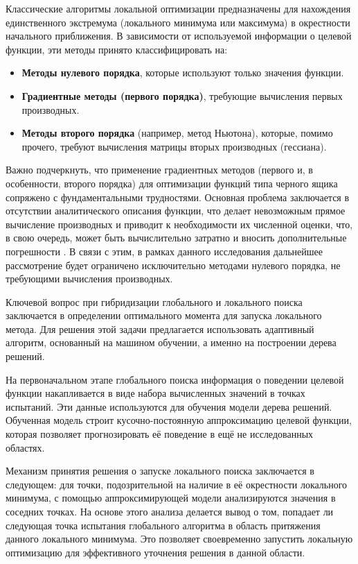 \documentclass[runningheads]{llncs}
\begin{document}


Классические алгоритмы локальной оптимизации предназначены для нахождения единственного экстремума (локального минимума или максимума) в окрестности начального приближения. В зависимости от используемой информации о целевой функции, эти методы принято классифицировать на:
\begin{itemize}
	\item \textbf{Методы нулевого порядка}, которые используют только значения функции.
	\item \textbf{Градиентные методы (первого порядка)}, требующие вычисления первых производных.
	\item \textbf{Методы второго порядка} (например, метод Ньютона), которые, помимо прочего, требуют вычисления матрицы вторых производных (гессиана).
\end{itemize}

Важно подчеркнуть, что применение градиентных методов (первого и, в особенности, второго порядка) для оптимизации функций типа черного ящика сопряжено с фундаментальными трудностями. Основная проблема заключается в отсутствии аналитического описания функции, что делает невозможным прямое вычисление производных и приводит к необходимости их численной оценки, что, в свою очередь, может быть вычислительно затратно и вносить дополнительные погрешности \cite{Kelley}. В связи с этим, в рамках данного исследования дальнейшее рассмотрение будет ограничено исключительно методами нулевого порядка, не требующими вычисления производных.


Ключевой вопрос при гибридизации глобального и локального поиска заключается в определении оптимального момента для запуска локального метода. Для решения этой задачи предлагается использовать адаптивный алгоритм, основанный на машином обучении, а именно на построении дерева решений.

На первоначальном этапе глобального поиска информация о поведении целевой функции накапливается в виде набора вычисленных значений в точках испытаний. Эти данные используются для обучения модели дерева решений. Обученная модель строит кусочно-постоянную аппроксимацию целевой функции, которая позволяет прогнозировать её поведение в ещё не исследованных областях.

Механизм принятия решения о запуске локального поиска заключается в следующем: для точки, подозрительной на наличие в её окрестности локального минимума, с помощью аппроксимирующей модели анализируются значения в соседних точках. На основе этого анализа делается вывод о том, попадает ли следующая точка испытания глобального алгоритма в область притяжения данного локального минимума. Это позволяет своевременно запустить локальную оптимизацию для эффективного уточнения решения в данной области.
\end{document}
